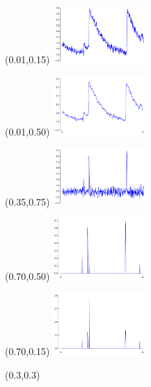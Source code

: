\documentclass[final]{beamer}
\begin{document}
\begin{frame}
\begin{textblock}{1}(0.01,0.15)
\includegraphics[width=3.5cm]{images/original_curve_2.pdf}
\end{textblock}


\begin{textblock}{1}(0.01,0.50)
\includegraphics[width=3.5cm]{images/filter_curve_2.pdf}
\end{textblock}

\begin{textblock}{1}(0.35,0.75)
\includegraphics[width=3.5cm]{images/diff_curve_2.pdf}
\end{textblock}

\begin{textblock}{1}(0.70,0.50)
\includegraphics[width=3.5cm]{images/threshold_curve_3.pdf}
\end{textblock}

\begin{textblock}{1}(0.70,0.15)
\includegraphics[width=3.5cm]{images/weights_curve_3.pdf}
\end{textblock}

\begin{textblock}{0.35}(0.3,0.3)


\end{textblock}
\end{frame}
\end{document}
